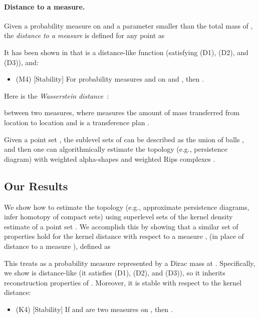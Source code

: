 \documentclass[11pt]{myclass}
\begin{document}
\paragraph{Distance to a measure.}
Given a probability measure  on  and a parameter  smaller than the total mass of ,
the \emph{distance to a measure}  \cite{ChazalCohen-SteinerMerigot2011} is defined for any point  as 

It has been shown in \cite{ChazalCohen-SteinerMerigot2011} that  is a distance-like function (satisfying (D1), (D2), and (D3)), and:
\begin{itemize} 
\item (M4)   [Stability] For probability measures  and  on  and , then .
\end{itemize}
Here  is the \emph{Wasserstein distance}~\cite{Villani2003}:  

between two measures, where  measures the amount of mass transferred from location  to location  and  is a transference plan \cite{Villani2003}.  



Given a point set , the sublevel sets of  can be described as the union of balls \cite{GuibasMerigotMorozov2011}, and then one can algorithmically estimate the topology (e.g., persistence diagram) with weighted alpha-shapes \cite{GuibasMerigotMorozov2011} and weighted Rips complexes \cite{BuchetChazalOudot2013}. 

\subsection{Our Results}
\label{sec:results}

We show how to estimate the topology (e.g., approximate persistence diagrams, infer homotopy of compact sets) using superlevel sets of the kernel density estimate of a point set .  
We accomplish this by showing that a similar set of properties hold for the kernel distance with respect to a measure ,  
(in place of distance to a measure ),  defined as 

This treats  as a probability measure represented by a Dirac mass at .  
Specifically, we show  is distance-like (it satisfies (D1), (D2), and (D3)), so it inherits reconstruction properties of .  Moreover, it is stable with respect to the kernel distance:
\begin{itemize}
\item (K4) [Stability] If  and  are two measures on , then 
. 
\end{itemize}
\end{document}

